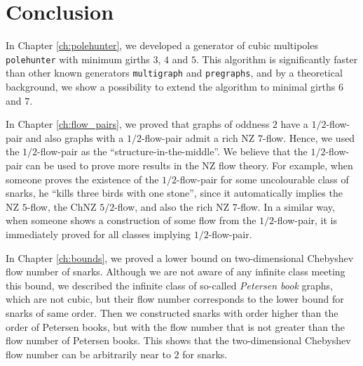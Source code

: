 \chapter*{Conclusion} %

In Chapter \ref{ch:polehunter}, we developed a generator of cubic multipoles \texttt{polehunter} with minimum girths $3$, $4$ and $5$. This algorithm is significantly faster than other known generators \texttt{multigraph} and \texttt{pregraphs}, and by a theoretical background, we show a possibility to extend the algorithm to minimal girths $6$ and $7$.

In Chapter \ref{ch:flow_pairs}, we proved that graphs of oddness $2$ have a $1/2$-flow-pair and also graphs with a $1/2$-flow-pair admit a rich NZ $7$-flow. Hence, we used the $1/2$-flow-pair as the ``structure-in-the-middle''. We believe that the $1/2$-flow-pair can be used to prove more results in the NZ flow theory. For example, when someone proves the existence of the $1/2$-flow-pair for some uncolourable class of snarks, he ``kills three birds with one stone'', since it automatically implies the NZ $5$-flow, the ChNZ $5/2$-flow, and also the rich NZ $7$-flow. In a similar way, when someone shows a construction of some flow from the $1/2$-flow-pair, it is immediately proved for all classes implying $1/2$-flow-pair.

In Chapter \ref{ch:bounds}, we proved a lower bound on two-dimensional Chebyshev flow number of snarks. Although we are not aware of any infinite class meeting this bound, we described the infinite class of so-called \emph{Petersen book} graphs, which are not cubic, but their flow number corresponds to the lower bound for snarks of same order. Then we constructed snarks with order higher than the order of Petersen books, but with the flow number that is not greater than the flow number of Petersen books. This shows that the two-dimensional Chebyshev flow number can be arbitrarily near to $2$ for snarks.